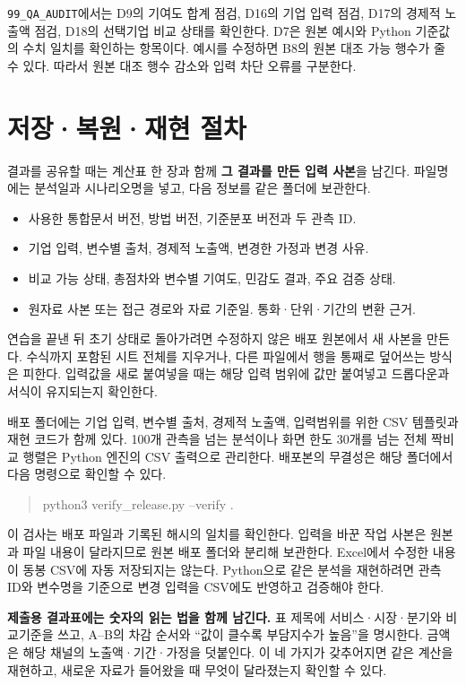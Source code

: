 \nolinkurl{99_QA_AUDIT}에서는 D9의 기여도 합계 점검, D16의 기업 입력 점검, D17의 경제적 노출액 점검, D18의 선택기업 비교 상태를 확인한다. D7은 원본 예시와 Python 기준값의 수치 일치를 확인하는 항목이다. 예시를 수정하면 B8의 원본 대조 가능 행수가 줄 수 있다. 따라서 원본 대조 행수 감소와 입력 차단 오류를 구분한다.

\section{저장·복원·재현 절차}

결과를 공유할 때는 계산표 한 장과 함께 \textbf{그 결과를 만든 입력 사본}을 남긴다. 파일명에는 분석일과 시나리오명을 넣고, 다음 정보를 같은 폴더에 보관한다.

\begin{itemize}[leftmargin=1.8em,itemsep=0.35em]
\item 사용한 통합문서 버전, 방법 버전, 기준분포 버전과 두 관측 ID.
\item 기업 입력, 변수별 출처, 경제적 노출액, 변경한 가정과 변경 사유.
\item 비교 가능 상태, 총점차와 변수별 기여도, 민감도 결과, 주요 검증 상태.
\item 원자료 사본 또는 접근 경로와 자료 기준일. 통화·단위·기간의 변환 근거.
\end{itemize}

연습을 끝낸 뒤 초기 상태로 돌아가려면 수정하지 않은 배포 원본에서 새 사본을 만든다. 수식까지 포함된 시트 전체를 지우거나, 다른 파일에서 행을 통째로 덮어쓰는 방식은 피한다. 입력값을 새로 붙여넣을 때는 해당 입력 범위에 값만 붙여넣고 드롭다운과 서식이 유지되는지 확인한다.

배포 폴더에는 기업 입력, 변수별 출처, 경제적 노출액, 입력범위를 위한 CSV 템플릿과 재현 코드가 함께 있다. 100개 관측을 넘는 분석이나 화면 한도 30개를 넘는 전체 짝비교 행렬은 Python 엔진의 CSV 출력으로 관리한다. 배포본의 무결성은 해당 폴더에서 다음 명령으로 확인할 수 있다.

\begin{quote}\small\ttfamily
python3 verify\_release.py --verify .
\end{quote}

이 검사는 배포 파일과 기록된 해시의 일치를 확인한다. 입력을 바꾼 작업 사본은 원본과 파일 내용이 달라지므로 원본 배포 폴더와 분리해 보관한다. Excel에서 수정한 내용이 동봉 CSV에 자동 저장되지는 않는다. Python으로 같은 분석을 재현하려면 관측 ID와 변수명을 기준으로 변경 입력을 CSV에도 반영하고 검증해야 한다.

\begin{ReportCallout}
\textbf{제출용 결과표에는 숫자의 읽는 법을 함께 남긴다.} 표 제목에 서비스·시장·분기와 비교기준을 쓰고, A--B의 차감 순서와 ``값이 클수록 부담지수가 높음''을 명시한다. 금액은 해당 채널의 노출액·기간·가정을 덧붙인다. 이 네 가지가 갖추어지면 같은 계산을 재현하고, 새로운 자료가 들어왔을 때 무엇이 달라졌는지 확인할 수 있다.
\end{ReportCallout}
